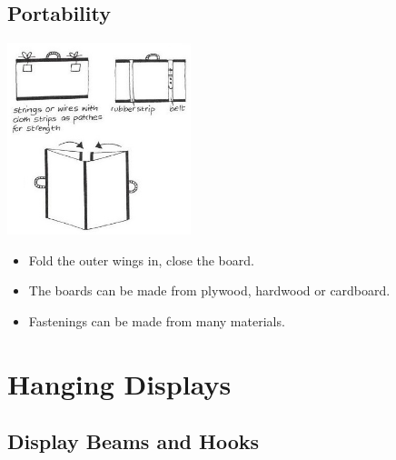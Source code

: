 \begin{multicols}{2}
\vfill
\columnbreak

\subsection{Portability}

\begin{center}
\includegraphics[width=0.4\textwidth]{./img/vso/zigzag-portability.jpg}
\end{center}

\begin{itemize}
\item Fold the outer wings in,
close the board.
\item The boards can be made from
plywood, hardwood or
cardboard.
\item Fastenings can be made from
many materials.
\end{itemize}

%
%


\section{Hanging Displays}


\subsection{Display Beams and Hooks}


\end{multicols}

